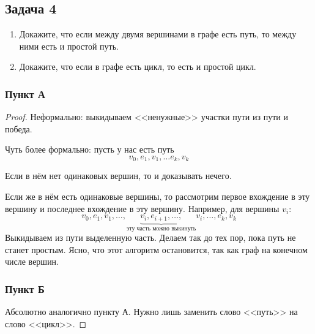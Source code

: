 \subsection{Задача 4}

\begin{enumerate}[label=\asbuk*)]
    \item Докажите, что если между двумя вершинами в графе есть путь, то между ними есть и простой путь.
    \item Докажите, что если в графе есть цикл, то есть и простой цикл.
\end{enumerate}

\subsubsection{Пункт А}

\begin{proof}
Неформально: выкидываем <<ненужные>> участки пути из пути и победа.

Чуть более формально: пусть у нас есть путь 
\[
v_0, e_1, v_1, \ldots e_k, v_k
\]

Если в нём нет одинаковых вершин, то и доказывать нечего.

Если же в нём есть одинаковые вершины, то рассмотрим первое вхождение в эту вершину и последнее вхождение в эту вершину. Например, для вершины $v_i$:
\[
v_0, e_1, v_1, \ldots, \underbrace{v_i, e_{i+1}, \ldots,}_{\text{эту часть можно выкинуть}} v_i, \ldots, e_k, v_k\textbf{}
\]
Выкидываем из пути выделенную часть. Делаем так до тех пор, пока путь не станет простым. Ясно, что этот алгоритм остановится, так как граф на конечном числе вершин.

\subsubsection{Пункт Б}
Абсолютно аналогично пункту А. Нужно лишь заменить слово <<путь>> на слово <<цикл>>.
\end{proof}

